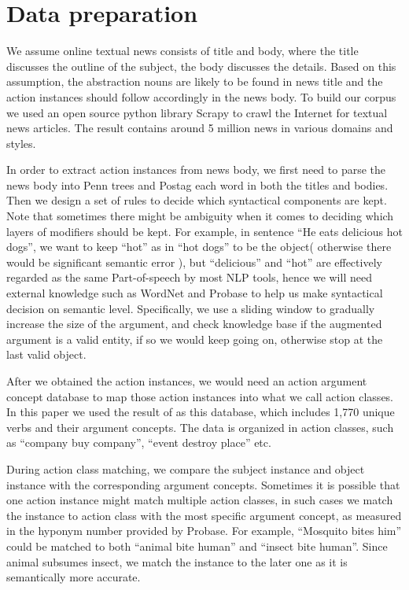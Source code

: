 \section{Data preparation}

We assume online textual news consists of title and body, where
the title discusses the outline of the subject, the body discusses
the details. Based on this assumption, the abstraction nouns are
likely to be found in news title and the action instances should
follow accordingly in the news body. To build our corpus
we used an open source python library Scrapy to crawl the Internet for textual news articles.
The result contains around 5 million news in various domains and styles.

In order to extract action instances from news body, we first need to
parse the news body into Penn trees and Postag each word in both
the titles and bodies. Then we design a set of rules to decide
which syntactical components are kept. Note that sometimes there might be ambiguity when it comes to
deciding which layers of modifiers should be kept.
 For example, in sentence ``He eats delicious hot dogs'', we want to keep
``hot'' as in ``hot dogs'' to be the object( otherwise there would be significant semantic error ),
but ``delicious'' and ``hot'' are effectively regarded as the same Part-of-speech by most NLP tools, hence we
will need external knowledge such as WordNet and Probase to help us make syntactical decision on semantic level.
Specifically, we use a sliding window to gradually increase the size of the argument, and check knowledge
base if the augmented argument is a valid entity, if so we would keep going on, otherwise stop at the last valid
object.

After we obtained the action instances, we would need an action argument concept database to map those action instances
into what we call action classes. In this paper we used the result of \cite{gong2015representing} as this database, which
includes 1,770 unique verbs and their argument concepts. The data is organized in action classes, such as ``company buy
company'', ``event destroy place'' etc.

During action class matching, we compare the subject instance and object instance with the corresponding argument concepts.
Sometimes it is possible that one action instance might match multiple action classes, in such cases we match the instance
to action class with the most specific argument concept, as measured in the hyponym number provided by Probase. For example,
``Mosquito bites him'' could be matched to both ``animal bite human'' and ``insect bite human''. Since animal subsumes insect,
we match the instance to the later one as it is semantically more accurate.

